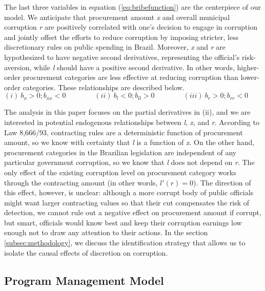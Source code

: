 \documentclass[11pt]{article}
\begin{document}
The last three variables in equation (\ref{eq:bribefunction}) are the centerpiece of our model. We anticipate that  procurement amount \emph{x} and overall municipal corruption \emph{r} are positively correlated with one's decision to engage in corruption and jointly offset the efforts to reduce corruption by imposing stricter, less discretionary rules on public spending in Brazil. Moreover, \emph{x} and \emph{r} are hypothesized to have negative second derivatives, representing the official's risk-aversion, while \emph{l} should have a positive second derivative. In other words, higher-order procurement categories are less effective at reducing corruption than lower-order categories. These relationships are described below.
\begin{equation} \label{eq:derivatives}
  (i) \   b_{x} > 0; b_{xx} < 0 \qquad \qquad
  (ii) \  b_{l} < 0; b_{ll} > 0 \qquad \qquad
  (iii) \ b_{r} > 0; b_{rr} < 0 \qquad \qquad
\end{equation}

The analysis in this paper focuses on the partial derivatives in (ii), and we are interested in potential endogenous relationships between \emph{l}, \emph{x}, and \emph{r}. According to Law 8,666/93, contracting rules are a deterministic function of procurement amount, so we know with certainty that \emph{l} is a function of \emph{x}. On the other hand, procurement categories in the Brazilian legislation are independent of any particular government corruption, so we know that \emph{l} does not depend on \emph{r}. The only effect of the existing corruption level on procurement category works through the contracting amount (in other words, $l'(r) = 0$). The direction of this effect, however, is unclear: although a more corrupt body of public officials might want larger contracting values so that their cut compensates the risk of detection, we cannot rule out a negative effect on procurement amount if corrupt, but smart, officials would know best and keep their corruption earnings low enough not to draw any attention to their actions. In the section \ref{subsec:methodology}, we discuss the identification strategy that allows us to isolate the causal effects of discretion on corruption.

\subsection{Program Management Model} \label{subsec:mismanagement}
\end{document}
